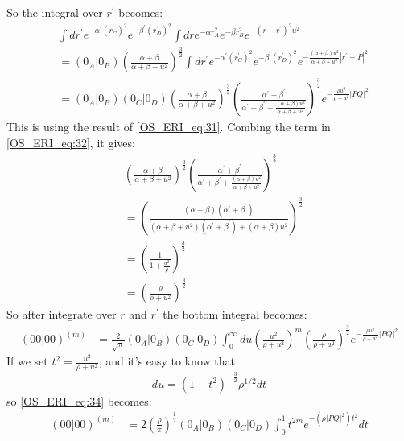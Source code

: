  So the integral over $r^{'}$ becomes:
\begin{equation}
 \begin{split}
   &\int dr^{'}  e^{-\alpha^{'} (r^{'}_{C})^{2}}e^{-\beta^{'} (r^{'}_{D})^{2}} 
   \int dr  e^{-\alpha r_{A}^{2}} e^{-\beta r_{B}^{2}} e^{-(r-r^{'})^{2}u^{2}} \\
&= (0_{A}|0_{B})\left( \frac{\alpha+\beta}{\alpha+\beta+u^{2}}\right)^{\frac{3}{2}}   
  \int dr^{'}  e^{-\alpha^{'} (r^{'}_{C})^{2}}e^{-\beta^{'} (r^{'}_{D})^{2}} 
   e^{-\frac{(\alpha+\beta)u^{2}}{\alpha+\beta+u^{2}}|r^{'}-P|^{2}} \\
&= (0_{A}|0_{B})(0_{C}|0_{D})
\left( \frac{\alpha+\beta}{\alpha+\beta+u^{2}}\right)^{\frac{3}{2}} 
\left( \frac{\alpha^{'}+\beta^{'}}{\alpha^{'}+\beta^{'}+ 
\frac{(\alpha+\beta)u^{2}}{\alpha+\beta+u^{2}}}\right)^{\frac{3}{2}}
e^{-\frac{\rho u^{2}}{\rho+ u^{2}}|PQ|^{2}}
\end{split} 
\label{OS_ERI_eq:32}
\end{equation}
This is using the result of \ref{OS_ERI_eq:31}. Combing the term in \ref{OS_ERI_eq:32},
it gives:
\begin{equation}
\begin{split}
 &\left( \frac{\alpha+\beta}{\alpha+\beta+u^{2}}\right)^{\frac{3}{2}} 
\left( \frac{\alpha^{'}+\beta^{'}}{\alpha^{'}+\beta^{'}+ 
\frac{(\alpha+\beta)u^{2}}{\alpha+\beta+u^{2}}}\right)^{\frac{3}{2}} \\
&= \left( \frac{(\alpha+\beta)(\alpha^{'}+\beta^{'})}
{(\alpha+\beta+u^{2})(\alpha^{'}+\beta^{'})+(\alpha+\beta)u^{2}}\right)^{\frac{3}{2}}\\
&= \left(\frac{1}{1+\frac{u^{2}}{\rho}}\right)^{\frac{3}{2}} \\
&= \left(\frac{\rho}{\rho+u^{2}}\right)^{\frac{3}{2}}
\end{split}
 \label{OS_ERI_eq:33}
\end{equation}
So after integrate over $r$ and $r^{'}$ the bottom integral becomes:
\begin{equation}
 \begin{split}
 (00|00)^{(m)} &=\frac{2}{\sqrt{\pi}}(0_{A}|0_{B})(0_{C}|0_{D})
 \int_{0}^{\infty} du \left( \frac{u^{2}}{\rho+u^{2}}\right)^{m}
 \left(\frac{\rho}{\rho+u^{2}}\right)^{\frac{3}{2}}
 e^{-\frac{\rho u^{2}}{\rho+ u^{2}}|PQ|^{2}} 
 \end{split}
\label{OS_ERI_eq:34}
\end{equation}
If we set $t^{2} = \frac{u^{2}}{\rho+ u^{2}}$, and it's easy to know
that 
\begin{equation}
 du = (1-t^{2})^{-\frac{3}{2}}\rho^{1/2} dt
 \label{OS_ERI_eq:35}
\end{equation}
so \ref{OS_ERI_eq:34} becomes:
\begin{equation}
 \begin{split}
 (00|00)^{(m)} &= 2\left( \frac{\rho}{\pi}\right)^{\frac{1}{2}}(0_{A}|0_{B})
(0_{C}|0_{D})\int^{1}_{0} t^{2m} e^{-(\rho|PQ|^{2})t^{2}} dt 
 \end{split}
\label{OS_ERI_complementary_result}
\end{equation}


